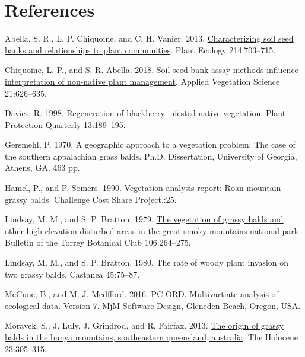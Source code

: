 \documentclass[
]{article}
\newlength{\cslhangindent}
\newlength{\cslentryspacingunit} %
\newenvironment{CSLReferences}[2] %
 {%
  \setlength{\parindent}{0pt}
  \ifodd #1
  \let\oldpar\par
  \def\par{\hangindent=\cslhangindent\oldpar}
  \fi
  \setlength{\parskip}{#2\cslentryspacingunit}
 }%
 {}
\begin{document}
\hypertarget{references}{%
\section*{References}\label{references}}

\hypertarget{refs}{}
\begin{CSLReferences}{1}{0}
\leavevmode{}%
Abella, S. R., L. P. Chiquoine, and C. H. Vanier. 2013. \href{https://doi.org/10.1007/s11258-013-0200-3}{Characterizing soil seed banks and relationships to plant communities}. Plant Ecology 214:703--715.

\leavevmode{}%
Chiquoine, L. P., and S. R. Abella. 2018. \href{https://doi.org/10.1111/avsc.12393}{Soil seed bank assay methods influence interpretation of non-native plant management}. Applied Vegetation Science 21:626--635.

\leavevmode{}%
Davies, R. 1998. Regeneration of blackberry-infested native vegetation. Plant Protection Quarterly 13:189--195.

\leavevmode{}%
Gersmehl, P. 1970. A geographic approach to a vegetation problem: The case of the southern appalachian grass balds. Ph.D. Dissertation, University of Georgia, Athens, GA. 463 pp.

\leavevmode{}%
Hamel, P., and P. Somers. 1990. Vegetation analysis report: Roan mountain grassy balds. Challenge Cost Share Project.:25.

\leavevmode{}%
Lindsay, M. M., and S. P. Bratton. 1979. \href{https://doi.org/10.2307/2560352}{The vegetation of grassy balds and other high elevation disturbed areas in the great smoky mountains national park}. Bulletin of the Torrey Botanical Club 106:264--275.

\leavevmode{}%
Lindsay, M. M., and S. P. Bratton. 1980. The rate of woody plant invasion on two grassy balds. Castanea 45:75--87.

\leavevmode{}%
McCune, B., and M. J. Medfford. 2016. \href{https://www.wildblueberrymedia.net/software}{PC-ORD. Multivartiate analysis of ecological data. Version 7}. MjM Software Design, Gleneden Beach, Oregon, USA.

\leavevmode{}%
Moravek, S., J. Luly, J. Grindrod, and R. Fairfax. 2013. \href{https://doi.org/10.1177/0959683612460792}{The origin of grassy balds in the bunya mountains, southeastern queensland, australia}. The Holocene 23:305--315.


\end{CSLReferences}
\end{document}
